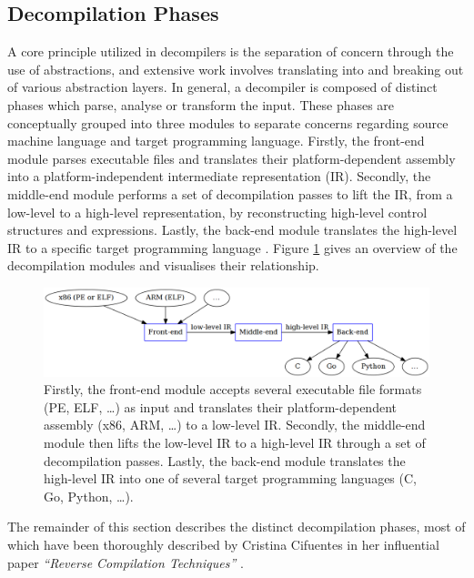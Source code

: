 
\subsection{Decompilation Phases}
\label{sec:lit_review_decompilation_phases}

A core principle utilized in decompilers is the separation of concern through the use of abstractions, and extensive work involves translating into and breaking out of various abstraction layers. In general, a decompiler is composed of distinct phases which parse, analyse or transform the input. These phases are conceptually grouped into three modules to separate concerns regarding source machine language and target programming language. Firstly, the front-end module parses executable files and translates their platform-dependent assembly into a platform-independent intermediate representation (IR). Secondly, the middle-end module performs a set of decompilation passes to lift the IR, from a low-level to a high-level representation, by reconstructing high-level control structures and expressions. Lastly, the back-end module translates the high-level IR to a specific target programming language \cite{reverse_comp}. Figure \ref{fig:modules_overview} gives an overview of the decompilation modules and visualises their relationship.

\begin{figure}[htbp]
	\begin{center}
		\includegraphics[width=\textwidth]{inc/2_lit_review/modules_overview.png}
		\caption{Firstly, the front-end module accepts several executable file formats (PE, ELF, …) as input and translates their platform-dependent assembly (x86, ARM, …) to a low-level IR. Secondly, the middle-end module then lifts the low-level IR to a high-level IR through a set of decompilation passes. Lastly, the back-end module translates the high-level IR into one of several target programming languages (C, Go, Python, …).}
		\label{fig:modules_overview}
	\end{center}
\end{figure}

The remainder of this section describes the distinct decompilation phases, most of which have been thoroughly described by Cristina Cifuentes in her influential paper \textit{``Reverse Compilation Techniques''} \cite{reverse_comp}.





